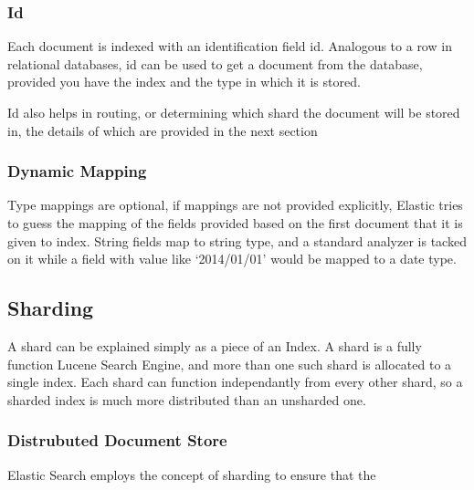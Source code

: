 \documentclass[12pt]{article}
\begin{document}
			\subsubsection{Id}
			Each document is indexed with an identification field id. Analogous to a row in relational databases, id can be used to get a document from the database, provided you have the index and the type in which it is stored. 

			Id also helps in routing, or determining which shard the document will be stored in, the details of which are provided in the next section

			\subsubsection{Dynamic Mapping}
			Type mappings are optional, if mappings are not provided explicitly, Elastic tries to guess the mapping of the fields provided based on the first document that it is given to index. String fields map to string type, and a standard analyzer is tacked on it while a field with value like `2014/01/01' would be mapped to a date type.

		\subsection{Sharding}
			A shard can be explained simply as a piece of an Index. A shard is a fully function Lucene Search Engine, and more than one such shard is allocated to a single index. Each shard can function independantly from every other shard, so a sharded index is much more distributed than an unsharded one.
			\subsubsection{Distrubuted Document Store}
				Elastic Search employs the concept of sharding to ensure that the 
	\newpage
	
	
\end{document}
